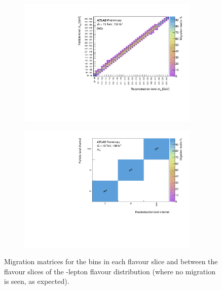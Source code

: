 \begin{figure}[htb]
  \begin{subfigure}{.49\textwidth}\centering\includegraphics[width = 0.95\textwidth]{Figures/m4l/UnfoldingStudies/v014_matrices/m4l_event_type1-3Matrix.pdf}\end{subfigure}
 \begin{subfigure}{.49\textwidth}\centering\includegraphics[width = 0.95\textwidth]{Figures/m4l/UnfoldingStudies/v014_matrices/m4l_event_typeMatrix.pdf}\end{subfigure}
\caption{Migration matrices for the \mFourL bins in each flavour slice and  between the flavour slices of the \mFourL-lepton flavour distribution (where no migration is seen, as expected).}
 \end{figure}


